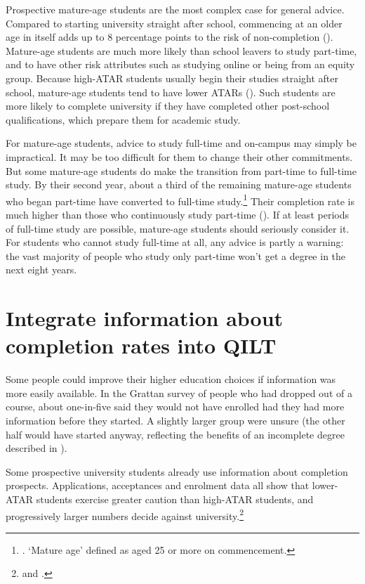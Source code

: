 Prospective mature-age students are the most complex case for general advice. Compared to starting university straight after school, commencing at an older age in itself adds up to 8 percentage points to the risk of non-completion (). Mature-age students are much more likely than school leavers to study part-time, and to have other risk attributes such as studying online or being from an equity group. Because high-ATAR students usually begin their studies straight after school, mature-age students tend to have lower ATARs (). Such students are more likely to complete university if they have completed other post-school qualifications, which prepare them for academic study.

For mature-age students, advice to study full-time and on-campus may simply be impractical. It may be too difficult for them to change their other commitments. But some mature-age students do make the transition from part-time to full-time study. By their second year, about a third of the remaining mature-age students who began part-time have converted to full-time study.\footnote{\textcite[][]{DepartmentofEducationandTraininga}. `Mature age' defined as aged 25 or more on commencement.} Their completion rate is much higher than those who continuously study part-time (). If at least periods of full-time study are possible, mature-age students should seriously consider it. For students who cannot study full-time at all, any advice is partly a warning: the vast majority of people who study only part-time won't get a degree in the next eight years.

\section{Integrate information about completion rates into QILT}\label{sec:5.2}

Some people could improve their higher education choices if information was more easily available. In the Grattan survey of people who had dropped out of a course, about one-in-five said they would not have enrolled had they had more information before they started. A slightly larger group were unsure (the other half would have started anyway, reflecting the benefits of an incomplete degree described in ).

Some prospective university students already use information about completion prospects. Applications, acceptances and enrolment data all show that lower-ATAR students exercise greater caution than high-ATAR students, and progressively larger numbers decide against university.\footnote{ and \textcite[][tables~A8.1 and A8.2]{DepartmentofEducationandTraining2017b}.}

